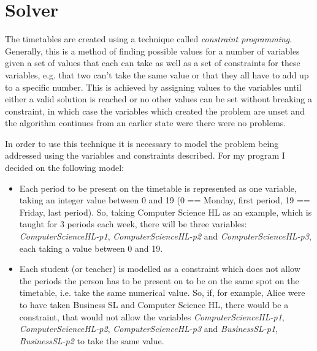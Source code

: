 \documentclass[12pt]{article}
\begin{document}
\section{Solver}

The timetables are created using a technique called \emph{constraint programming}.
Generally, this is a method of finding possible values for a number of variables given a set
of values that each can take as well as a set of constraints for these variables, e.g. that
two can't take the same value or that they all have to add up to a specific number.  This is
achieved by assigning values to the variables until either a valid solution is reached or no
other values can be set without breaking a constraint, in which case the variables which
created the problem are unset and the algorithm continues from an earlier state were there
were no problems.

In order to use this technique it is necessary to model the problem being addressed using
the variables and constraints described. For my program I decided on the following model:
%
\begin{itemize}
    \item Each period to be present on the timetable is represented as one variable, taking
        an integer value between 0 and 19 (0 == Monday, first period, 19 == Friday, last
        period). So, taking Computer Science HL as an example, which is taught for 3 periods
        each week, there will be three variables: \textit{ComputerScienceHL-p1},
        \textit{ComputerScienceHL-p2} and \textit{ComputerScienceHL-p3}, each taking a value
        between 0 and 19.

    \item Each student (or teacher) is modelled as a constraint which does not allow the
        periods the person has to be present on to be on the same spot on the timetable,
        i.e. take the same numerical value. So, if, for example, Alice were to have taken
        Business SL and Computer Science HL, there would be a constraint, that would not
        allow the variables \textit{ComputerScienceHL-p1}, \textit{ComputerScienceHL-p2},
        \textit{ComputerScienceHL-p3} and \textit{BusinessSL-p1}, \textit{BusinessSL-p2} to
        take the same value.
\end{itemize}
%

\inputminted{python}{solver_listing.py}

\printbibliography[type=software,title={Libraries}]
\end{document}
